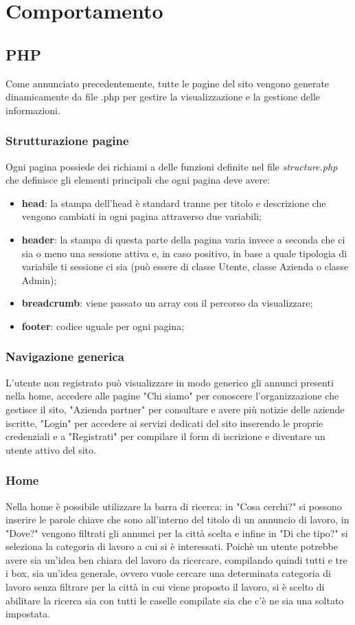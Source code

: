 \section{Comportamento}
	\subsection{PHP}
	Come annunciato precedentemente, tutte le pagine del sito vengono generate dinamicamente da file .php per gestire la visualizzazione e la gestione delle informazioni.
	
		\subsubsection{Strutturazione pagine}
		Ogni pagina possiede dei richiami a delle funzioni definite nel file \emph{structure.php} che definisce gli elementi principali che ogni pagina deve avere:
		\begin{itemize}
			\item \textbf{head}: la stampa dell'head è standard tranne per titolo e descrizione che vengono cambiati in ogni pagina attraverso due variabili;
			\item \textbf{header}: la stampa di questa parte della pagina varia invece a seconda che ci sia o meno una sessione attiva e, in caso positivo, in base a quale tipologia di variabile ti sessione ci sia (può essere di classe Utente, classe Azienda o classe Admin);
			\item \textbf{breadcrumb}: viene passato un array con il percorso da visualizzare;
			\item \textbf{footer}: codice uguale per ogni pagina;
		\end{itemize}
		\subsubsection{Navigazione generica}
		L'utente non registrato può visualizzare in modo generico gli annunci presenti nella home, accedere alle pagine "Chi siamo" per conoscere l'organizzazione che gestisce il sito, "Azienda partner" per consultare e avere più notizie delle aziende iscritte, "Login" per accedere ai servizi dedicati del sito inserendo le proprie credenziali e a "Registrati" per compilare il form di iscrizione e diventare un utente attivo del sito.
		
		\subsubsection{Home}
		Nella home è possibile utilizzare la barra di ricerca: in "Cosa cerchi?" si possono inserire le parole chiave che sono all'interno del titolo di un annuncio di lavoro, in "Dove?" vengono filtrati gli annunci per la città scelta e infine in "Di che tipo?" si seleziona la categoria di lavoro a cui si è interessati.
		Poichè un utente potrebbe avere sia un'idea ben chiara del lavoro da ricercare, compilando quindi tutti e tre i box, sia un'idea generale, ovvero vuole cercare una determinata categoria di lavoro senza filtrare per la città in cui viene proposto il lavoro, si è scelto di abilitare la ricerca sia con tutti le caselle compilate sia che c'è ne sia una soltato impostata.
